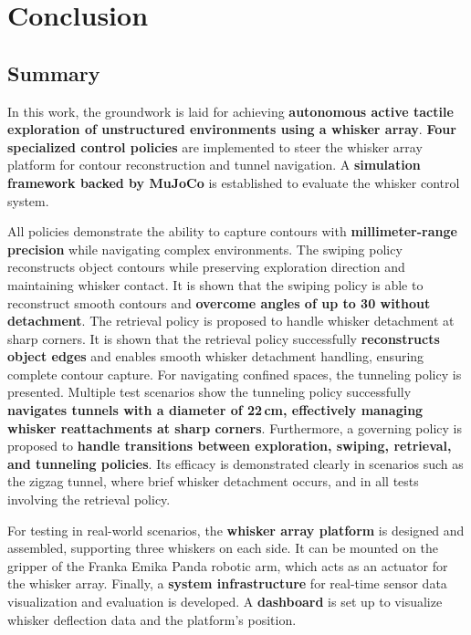 

\chapter{Conclusion}


\section{Summary}

In this work, the groundwork is laid for achieving \textbf{autonomous active tactile exploration of unstructured environments using a whisker array}.
\textbf{Four specialized control policies} are implemented to steer the whisker array platform for contour reconstruction and tunnel navigation.
A \textbf{simulation framework backed by MuJoCo} is established to evaluate the whisker control system.

All policies demonstrate the ability to capture contours with \textbf{millimeter-range precision} while navigating complex environments.
The swiping policy reconstructs object contours while preserving exploration direction and maintaining whisker contact.
It is shown that the swiping policy is able to reconstruct smooth contours and \textbf{overcome angles of up to 30\degree{} without detachment}.
The retrieval policy is proposed to handle whisker detachment at sharp corners.
It is shown that the retrieval policy successfully \textbf{reconstructs object edges} and enables smooth whisker detachment handling, ensuring complete contour capture.
For navigating confined spaces, the tunneling policy is presented.
Multiple test scenarios show the tunneling policy successfully \textbf{navigates tunnels with a diameter of 22\,cm, effectively managing whisker reattachments at sharp corners}.
Furthermore, a governing policy is proposed to \textbf{handle transitions between exploration, swiping, retrieval, and tunneling policies}.
Its efficacy is demonstrated clearly in scenarios such as the zigzag tunnel, where brief whisker detachment occurs, and in all tests involving the retrieval policy.

For testing in real-world scenarios, the \textbf{whisker array platform} is designed and assembled, supporting three whiskers on each side.
It can be mounted on the gripper of the Franka Emika Panda robotic arm, which acts as an actuator for the whisker array.
Finally, a \textbf{system infrastructure} for real-time sensor data visualization and evaluation is developed.
A \textbf{dashboard} is set up to visualize whisker deflection data and the platform's position.


